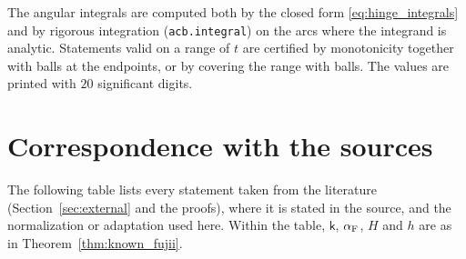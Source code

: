 \documentclass[11pt,a4paper]{article}
\makeatletter
\numberwithin{equation}{section}
\DeclareRobustCommand{\CGref}[1]{\ref{#1}}
\DeclareRobustCommand{\CGeqref}[1]{\eqref{#1}}
\let\CG@origref\ref
\let\CG@origeqref\eqref
\newcommand{\CG@gettip}[1]{\@ifundefined{CGTip@#1}{#1}{\csname CGTip@#1\endcsname}}
\DeclareRobustCommand{\CGref}[1]{\pdftooltip{\CG@origref{#1}}{\CG@gettip{#1}}}
\DeclareRobustCommand{\CGeqref}[1]{\pdftooltip{\CG@origeqref{#1}}{\CG@gettip{#1}}}
\theoremstyle{definition}
\theoremstyle{remark}
\makeatother
\begin{document}
The angular integrals are computed both by the closed form \CGeqref{eq:hinge_integrals} and by rigorous integration (\texttt{acb.integral}) on the arcs where the integrand is analytic. Statements valid on a range of $t$ are certified by monotonicity together with balls at the endpoints, or by covering the range with balls. The values are printed with $20$ significant digits.





\section{Correspondence with the sources}\label{app:sources}
The following table lists every statement taken from the literature (Section~\CGref{sec:external} and the proofs), where it is stated in the source, and the normalization or adaptation used here. Within the table, $\mathsf k$, $\alpha_{\rm F}$, $H$ and $h$ are as in Theorem~\CGref{thm:known_fujii}.
\end{document}
